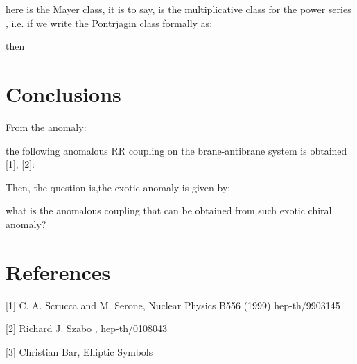 \documentclass[a4paper,a4paper]{article}
\begin{document}
here \coordHE{} is the Mayer class, it is to say, is the multiplicative class for the
power series \coordHE{}, i.e. if we write the Pontrjagin class \coordHE{}
formally as:
\begin{center}
\setlength{\baselineskip}{40pt}
 {  \coordHE{} }
\end{center}
then
\begin{center}
\setlength{\baselineskip}{40pt}
 {  \coordHE{} }
\end{center}

\section{Conclusions}

From the anomaly:
\begin{center}
\setlength{\baselineskip}{40pt}
 {  \coordHE{}
}
\end{center}
the following anomalous RR coupling on the brane-antibrane system is obtained [1],
[2]:
\begin{center}
\setlength{\baselineskip}{40pt}
 {  \coordHE{}
}
\end{center}

Then, the question is,the exotic anomaly is given by:
\begin{center}
\setlength{\baselineskip}{40pt}
 {  \coordHE{} }
\end{center}
what is the anomalous coupling that can be obtained from such exotic chiral anomaly?
\section{References}

[1]  C. A. Scrucca  and M. Serone, Nuclear Physics B556 (1999)  hep-th/9903145

[2]  Richard J. Szabo ,  hep-th/0108043

[3]  Christian Bar,  Elliptic Symbols
\end{document}
